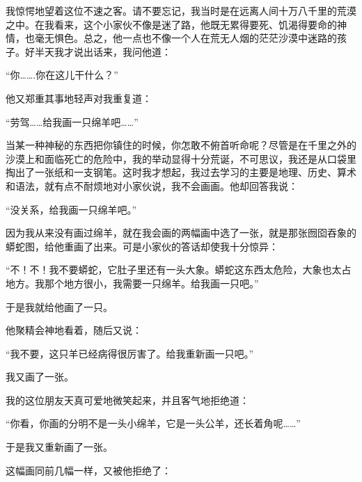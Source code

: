 {\startalignment[center]
 \stopalignment}

我惊愕地望着这位不速之客。请不要忘记，我当时是在远离人间十万八千里的荒漠之中。在我看来，这个小家伙不像是迷了路，他既无累得要死、饥渴得要命的神情，也毫无惧色。总之，他一点也不像一个人在荒无人烟的茫茫沙漠中迷路的孩子。好半天我才说出话来，我问他道：

“你\ldots{}\ldots{}.你在这儿干什么？”

他又郑重其事地轻声对我重复道：

“劳驾\ldots{}\ldots{}给我画一只绵羊吧\ldots{}\ldots{}”

当某一种神秘的东西把你镇住的时候，你怎敢不俯首听命呢？尽管是在千里之外的沙漠上和面临死亡的危险中，我的举动显得十分荒诞，不可思议，我还是从口袋里掏出了一张纸和一支钢笔。这时我才想起，我过去学习的主要是地理、历史、算术和语法，就有点不耐烦地对小家伙说，我不会画画。他却回答我说：

“没关系，给我画一只绵羊吧。”

因为我从来没有画过绵羊，就在我会画的两幅画中选了一张，就是那张囫囵吞象的蟒蛇图，给他重画了出来。可是小家伙的答话却使我十分惊异：

“不！不！我不要蟒蛇，它肚子里还有一头大象。蟒蛇这东西太危险，大象也太占地方。我那个地方很小，我需要一只绵羊。给我画一只吧。”

于是我就给他画了一只。

{\startalignment[center]
 \stopalignment}

他聚精会神地看着，随后又说：

“我不要，这只羊已经病得很厉害了。给我重新画一只吧。”

我又画了一张。

{\startalignment[center]
 \stopalignment}

我的这位朋友天真可爱地微笑起来，并且客气地拒绝道：

“你看，你画的分明不是一头小绵羊，它是一头公羊，还长着角呢\ldots{}\ldots{}”

于是我又重新画了一张。

{\startalignment[center]
 \stopalignment}

这幅画同前几幅一样，又被他拒绝了：

